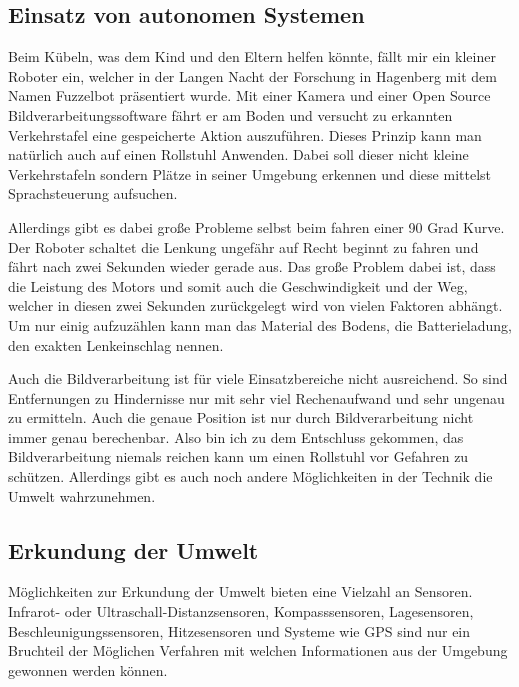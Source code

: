 \subsection{Einsatz von autonomen Systemen}
Beim Kübeln, was dem Kind und den Eltern helfen könnte, fällt mir ein kleiner Roboter ein, welcher in der Langen Nacht der Forschung in Hagenberg mit dem Namen Fuzzelbot präsentiert wurde.
Mit einer Kamera und einer Open Source Bildverarbeitungssoftware fährt er am Boden und versucht zu erkannten Verkehrstafel eine gespeicherte Aktion auszuführen.
Dieses Prinzip kann man natürlich auch auf einen Rollstuhl Anwenden.
Dabei soll dieser nicht kleine Verkehrstafeln sondern Plätze in seiner Umgebung erkennen und diese mittelst Sprachsteuerung aufsuchen.

Allerdings gibt es dabei große Probleme selbst beim fahren einer 90 Grad Kurve.
Der Roboter schaltet die Lenkung ungefähr auf Recht beginnt zu fahren und fährt nach zwei Sekunden wieder gerade aus.
Das große Problem dabei ist, dass die Leistung des Motors und somit auch die Geschwindigkeit und der Weg, welcher in diesen zwei Sekunden zurückgelegt wird von vielen Faktoren abhängt.
Um nur einig aufzuzählen kann man das Material des Bodens, die Batterieladung, den exakten Lenkeinschlag nennen.

Auch die Bildverarbeitung ist für viele Einsatzbereiche nicht ausreichend.
So sind Entfernungen zu Hindernisse nur mit sehr viel Rechenaufwand und sehr ungenau zu ermitteln.
Auch die genaue Position ist nur durch Bildverarbeitung nicht immer genau berechenbar.
Also bin ich zu dem Entschluss gekommen, das Bildverarbeitung niemals reichen kann um einen Rollstuhl vor Gefahren zu schützen.
Allerdings gibt es auch noch andere Möglichkeiten in der Technik die Umwelt wahrzunehmen.


\subsection{Erkundung der Umwelt}
Möglichkeiten zur Erkundung der Umwelt bieten eine Vielzahl an Sensoren.
Infrarot- oder Ultraschall-Distanzsensoren, Kompasssensoren, Lagesensoren, Beschleunigungssensoren, Hitzesensoren und Systeme wie GPS sind nur ein Bruchteil der Möglichen Verfahren mit welchen Informationen aus der Umgebung gewonnen werden können.

